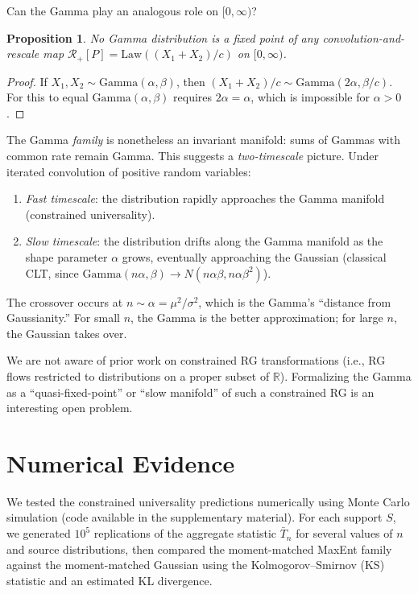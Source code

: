 \documentclass[aps,pre,twocolumn,superscriptaddress,nofootinbib]{revtex4-2}
\newtheorem{proposition}[theorem]{Proposition}
\theoremstyle{definition}
\theoremstyle{remark}
\newcommand{\R}{\mathbb{R}}
\begin{document}
Can the Gamma play an analogous role on $[0,\infty)$?

\begin{proposition}\label{prop:gamma-not-fp}
No Gamma distribution is a fixed point of any convolution-and-rescale map
$\mathcal{R}_+[P]=\mathrm{Law}((X_1{+}X_2)/c)$ on $[0,\infty)$.
\end{proposition}

\begin{proof}
If $X_1,X_2\sim\mathrm{Gamma}(\alpha,\beta)$, then $(X_1{+}X_2)/c\sim
\mathrm{Gamma}(2\alpha,\beta/c)$. For this to equal
$\mathrm{Gamma}(\alpha,\beta)$ requires $2\alpha=\alpha$, which is impossible
for $\alpha>0$.
\end{proof}

The Gamma \emph{family} is nonetheless an invariant manifold: sums of Gammas
with common rate remain Gamma.  This suggests a \emph{two-timescale} picture.
Under iterated convolution of positive random variables:
\begin{enumerate}
\item \emph{Fast timescale}: the distribution rapidly approaches the Gamma
manifold (constrained universality).
\item \emph{Slow timescale}: the distribution drifts along the Gamma manifold
as the shape parameter $\alpha$ grows, eventually approaching the Gaussian
(classical CLT, since $\mathrm{Gamma}(n\alpha,\beta)\to N(n\alpha\beta,
n\alpha\beta^2)$).
\end{enumerate}
The crossover occurs at $n\sim\alpha=\mu^2/\sigma^2$, which is the Gamma's
``distance from Gaussianity.''  For small $n$, the Gamma is the better
approximation; for large $n$, the Gaussian takes over.

We are not aware of prior work on constrained RG transformations (i.e., RG
flows restricted to distributions on a proper subset of $\R$).  Formalizing
the Gamma as a ``quasi-fixed-point'' or ``slow manifold'' of such a
constrained RG is an interesting open problem.

\section{Numerical Evidence}\label{sec:numerics}

We tested the constrained universality predictions numerically using Monte
Carlo simulation (code available in the supplementary material).  For each
support $S$, we generated $10^5$ replications of the aggregate statistic
$\bar{T}_n$ for several values of $n$ and source distributions, then compared
the moment-matched MaxEnt family against the moment-matched Gaussian using the
Kolmogorov--Smirnov (KS) statistic and an estimated KL divergence.
\end{document}
